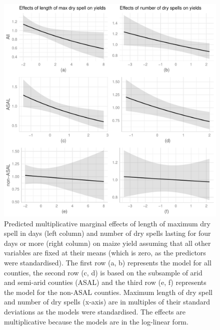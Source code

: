 \documentclass[12pt]{iopart}
\begin{document}
{  \begin{figure}
   \includegraphics{Figure3a_3f.pdf}
\caption{Predicted multiplicative marginal effects of length of maximum dry spell in days (left column) and number of dry spells lasting for four days or more (right column) on maize yield assuming that all other variables are fixed at their means (which is zero, as the predictors were standardised). The first row (a, b) represents the model for all counties, the second row (c, d) is based on the subsample of arid and semi-arid counties (ASAL) and the third row (e, f) represents the model for the non-ASAL counties. Maximum length of dry spell and number of dry spells (x-axis) are in multiples of their standard deviations as the models were standardised. The effects are multiplicative because the models are in the log-linear form.}\label{MarEff3}
\end{figure}

}
\end{document}
